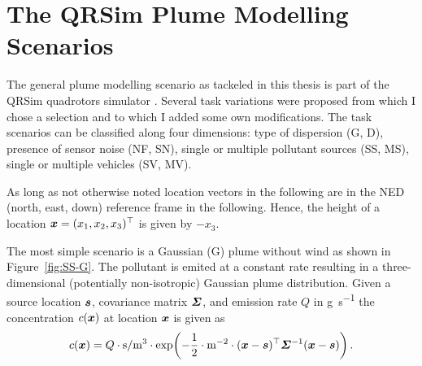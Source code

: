 \chapter{The QRSim Plume Modelling Scenarios}
The general plume modelling scenario as tackeled in this thesis is part of the 
QRSim quadrotors simulator \parencite{denardi2013rn}. Several task variations 
were proposed from which I chose a selection and to which I added some own 
modifications.  The task scenarios can be classified along four dimensions: type 
of dispersion (G, D), presence of sensor noise (NF, SN), single or multiple 
pollutant sources (SS, MS), single or multiple vehicles (SV, MV).

As long as not otherwise noted location vectors in the following are in the NED 
(north, east, down) reference frame in 
the following.  Hence, the height of a location $\bm{x} = (x_1, x_2, x_3)^{\top}$ is 
given by $-x_3$.

The most simple scenario is a Gaussian (G) plume without wind as shown in 
Figure~\ref{fig:SS-G}.  The pollutant is emited at a constant rate resulting in 
a three-dimensional (potentially non-isotropic) Gaussian plume distribution.  
Given a source location $\bm{s}$, covariance matrix $\bm{\varSigma}$, and 
emission rate $Q$ in \si{\gram\per\second} the concentration $c(\bm{x})$ at 
location $\bm{x}$ is given as
\begin{equation}
    c(\vc x) = Q \cdot \si{\second\per\meter^3} \cdot \exp\!\del{-\frac{1}{2} 
        \cdot \si{\meter^{-2}} \cdot (\vc x - \vc s)\Tr \mat \varSigma^{-1} (\vc 
        x - \vc s)}.
\end{equation}

